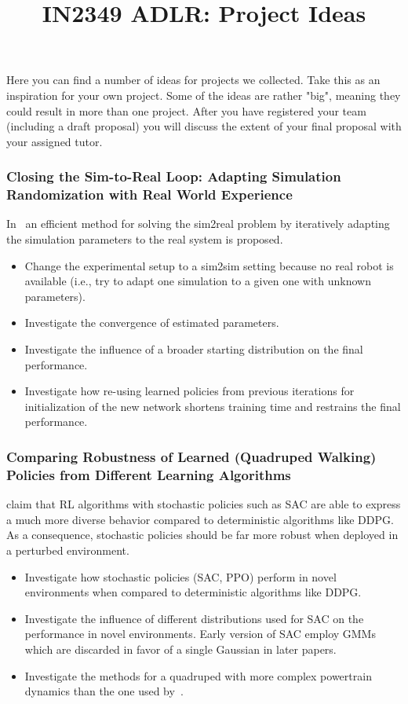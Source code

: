 \documentclass[a4paper]{article}
\title{IN2349 ADLR: Project Ideas}
\begin{document}
\maketitle

Here you can find a number of ideas for projects we collected. Take this as an inspiration for your own project. Some of the ideas are rather "big", meaning they could result in more than one project. After you have registered your team (including a draft proposal) you will discuss the extent of your final proposal with your assigned tutor.

\subsubsection{Closing the Sim-to-Real Loop: Adapting Simulation Randomization with Real World Experience}
In~\cite{Chebotar2018} an efficient method for solving the sim2real problem by iteratively adapting the simulation parameters to the real system is proposed.
\begin{itemize}
\item Change the experimental setup to a sim2sim setting because no real robot is available (i.e., try to adapt one simulation to a given one with unknown parameters).
\item Investigate the convergence of estimated parameters.
\item Investigate the influence of a broader starting distribution on the final performance.
\item Investigate how re-using learned policies from previous iterations for initialization of the new network shortens training time and restrains the final performance.
\end{itemize}

\subsubsection{Comparing Robustness of Learned (Quadruped Walking) Policies from Different Learning Algorithms}
\cite{Haarnoja2018b} claim that RL algorithms with stochastic policies such as SAC are able to express a much more diverse behavior compared to deterministic algorithms like DDPG. As a consequence, stochastic policies should be far more robust when deployed in a perturbed environment.
\begin{itemize}
\item Investigate how stochastic policies (SAC, PPO) perform in novel environments when compared to deterministic algorithms like DDPG.
\item Investigate the influence of different distributions used for SAC on the performance in novel environments. Early version of SAC employ GMMs which are discarded in favor of a single Gaussian in later papers.
\item Investigate the methods for a quadruped with more complex powertrain dynamics than the one used by~\cite{Haarnoja2018b}.
\end{itemize}
\end{document}
